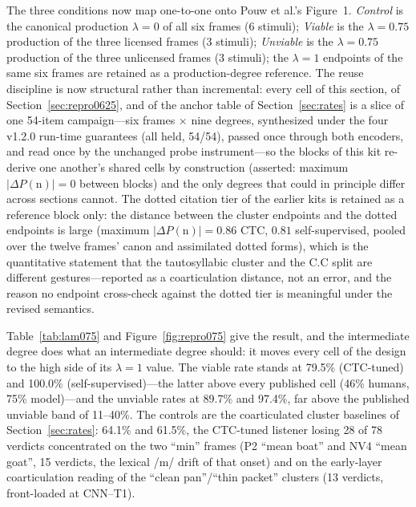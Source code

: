 \documentclass[11pt,a4paper]{article}
\newcommand{\lam}{\lambda}
\begin{document}
The three conditions now map one-to-one onto Pouw et al.'s
Figure~1. \emph{Control} is the canonical production $\lam=0$ of all
six frames (6 stimuli); \emph{Viable} is the $\lam=0.75$ production of
the three licensed frames (3 stimuli); \emph{Unviable} is the
$\lam=0.75$ production of the three unlicensed frames (3 stimuli); the
$\lam=1$ endpoints of the same six frames are retained as a
production-degree reference. The reuse discipline is now structural
rather than incremental: every cell of this section, of
Section~\ref{sec:repro0625}, and of the anchor table of
Section~\ref{sec:rates} is a slice of one 54-item campaign---six
frames $\times$ nine degrees, synthesized under the four v1.2.0
run-time guarantees (all held, 54/54), passed once through both
encoders, and read once by the unchanged probe instrument---so the
blocks of this kit re-derive one another's shared cells by
construction (asserted: maximum $|{\Delta}P(\mathrm{n})| = 0$ between
blocks) and the only degrees that could in principle differ across
sections cannot. The dotted citation tier of the earlier kits is
retained as a reference block only: the distance between the cluster
endpoints and the dotted endpoints is large (maximum
$|{\Delta}P(\mathrm{n})| = 0.86$ CTC, $0.81$ self-supervised, pooled
over the twelve frames' canon and assimilated dotted forms), which is
the quantitative statement that the tautosyllabic cluster and the C.C
split are different gestures---reported as a coarticulation distance,
not an error, and the reason no endpoint cross-check against the
dotted tier is meaningful under the revised semantics.

Table~\ref{tab:lam075} and Figure~\ref{fig:repro075} give the
result, and the intermediate degree does what an intermediate degree
should: it moves every cell of the design to the high side of its
$\lam=1$ value. The viable rate stands at 79.5\% (CTC-tuned) and
100.0\% (self-supervised)---the latter above every published cell
(46\% humans, 75\% model)---and the unviable rates at 89.7\% and
97.4\%, far above the published unviable band of 11--40\%. The
controls are the coarticulated cluster baselines of
Section~\ref{sec:rates}: 64.1\% and 61.5\%, the CTC-tuned listener
losing 28 of 78 verdicts concentrated on the two ``min'' frames
(P2 ``mean boat'' and NV4 ``mean goat'', 15 verdicts, the lexical
/m/ drift of that onset) and on the early-layer coarticulation
reading of the ``clean pan''/``thin packet'' clusters (13 verdicts,
front-loaded at CNN--T1).
\end{document}
